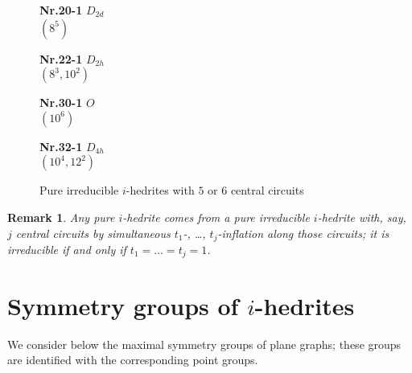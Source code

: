 \documentclass[12pt]{article}
\newtheorem{remark}{Remark}
\begin{document}
\begin{figure}
{\small
\setlength{\unitlength}{1cm}
\begin{minipage}[t]{3.5cm}
\centering
\epsfxsize=2.5cm
\par
{{\bf Nr.20-1} \quad $D_{2d}$ \\ $(8^5)$ \\ }
\end{minipage}
\begin{minipage}[t]{3.5cm}
\centering
\epsfxsize=2.5cm
\par
{{\bf Nr.22-1} \quad $D_{2h}$ \\ $(8^3,10^2)$ \\ }
\end{minipage}
\setlength{\unitlength}{1cm}
\begin{minipage}[t]{3.5cm}
\centering
\epsfxsize=2.3cm
\par
{{\bf Nr.30-1} \quad $O$ \\ $(10^6)$ \\}
\end{minipage}
\setlength{\unitlength}{1cm}
\begin{minipage}[t]{3.5cm}
\centering
\epsfxsize=2.3cm
\par
{{\bf Nr.32-1} \quad $D_{4h}$ \\ $(10^4,12^2)$ \\}
\end{minipage}
}
\caption{Pure irreducible $i$-hedrites with $5$ or $6$ central circuits}
\label{ThePureIrreducibleOctahedriteWith56CC}
\end{figure}







\begin{remark}

Any pure $i$-hedrite comes from a pure {\em irreducible} $i$-hedrite 
with, say, $j$ central circuits by simultaneous $t_1$-, \dots, $t_j$-inflation along those circuits; it is irreducible if and only if $t_1=\dots=t_j=1$.

\end{remark}






\section{Symmetry groups of $i$-hedrites}
We consider below the maximal symmetry groups of plane graphs; these groups are identified with the corresponding point groups.
\end{document}
